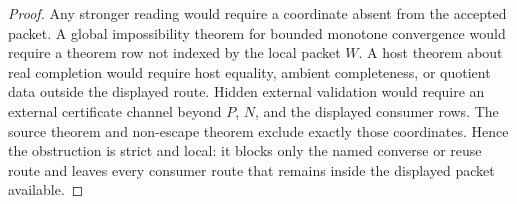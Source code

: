 \begin{proof}
Any stronger reading would require a coordinate absent from the accepted packet. A global impossibility theorem for bounded monotone convergence would require a theorem row not indexed by the local packet $W$. A host theorem about real completion would require host equality, ambient completeness, or quotient data outside the displayed route. Hidden external validation would require an external certificate channel beyond $P$, $N$, and the displayed consumer rows. The source theorem and non-escape theorem exclude exactly those coordinates. Hence the obstruction is strict and local: it blocks only the named converse or reuse route and leaves every consumer route that remains inside the displayed packet available.
\end{proof}
